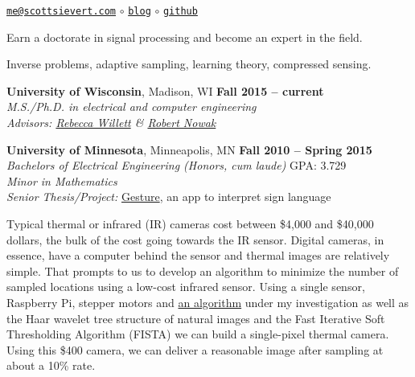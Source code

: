 \vspace{-1.1em}

\texttt{\href{mailto:me@scottsievert.com}{me@scottsievert.com}}
$\circ$
\texttt{\href{\homepage}{blog}}
$\circ$
\texttt{\href{\github}{github}}

\vspace{-1em}

    Earn a doctorate in signal processing and become an expert in the field.
    \vspace{-1em}

    Inverse problems, adaptive sampling, learning theory, compressed sensing.

    \textbf{University of Wisconsin}, Madison, WI \hfill \textbf{Fall 2015 -- current}\\
    \textsl{M.S./Ph.D. in electrical and computer engineering}\\
    \textsl{Advisors: \href{http://willett.ece.wisc.edu}{Rebecca Willett} \& \href{http://nowak.ece.wisc.edu}{Robert Nowak}}
    \vspace{-0.5em}

    \textbf{University of Minnesota}, Minneapolis, MN \hfill \textbf{Fall 2010 -- Spring 2015}\\
    \textsl{Bachelors of Electrical Engineering (Honors, cum laude) } \hfill GPA: 3.729\\
    \textsl{Minor in Mathematics} \\
    \textsl{Senior Thesis/Project:} \href{\gesture}{Gesture}, an app to interpret sign language
    \vspace{-0.5em}

    Typical thermal or infrared (IR) cameras cost between \$4,000 and \$40,000 dollars, the bulk of the cost going towards the IR sensor. Digital cameras, in essence, have a computer behind the sensor and thermal images are relatively simple. That prompts to us to develop an algorithm to minimize the number of sampled locations using a low-cost infrared sensor. Using a single sensor, Raspberry Pi, stepper motors and \href{\tree}{an algorithm} under my investigation as well as the Haar wavelet tree structure of natural images and the Fast Iterative Soft Thresholding Algorithm (FISTA) we can build a single-pixel thermal camera.
    Using this \$400 camera, we can deliver a reasonable image after sampling at about a 10\% rate.

